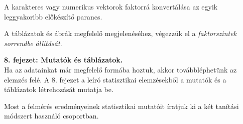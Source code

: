 \documentclass[
]{book}
\newenvironment{Shaded}{\begin{snugshade}}{\end{snugshade}}
\newcommand{\AttributeTok}[1]{\textcolor[rgb]{0.77,0.63,0.00}{#1}}
\newcommand{\CommentTok}[1]{\textcolor[rgb]{0.56,0.35,0.01}{\textit{#1}}}
\newcommand{\DecValTok}[1]{\textcolor[rgb]{0.00,0.00,0.81}{#1}}
\newcommand{\FunctionTok}[1]{\textcolor[rgb]{0.00,0.00,0.00}{#1}}
\newcommand{\NormalTok}[1]{#1}
\newcommand{\OtherTok}[1]{\textcolor[rgb]{0.56,0.35,0.01}{#1}}
\newcommand{\SpecialCharTok}[1]{\textcolor[rgb]{0.00,0.00,0.00}{#1}}
\newcommand{\StringTok}[1]{\textcolor[rgb]{0.31,0.60,0.02}{#1}}
\begin{document}
A karakteres vagy numerikus vektorok faktorrá konvertálása az egyik leggyakoribb előkészítő parancs.

\begin{Shaded}
\end{Shaded}

A táblázatok és ábrák megfelelő megjelenéséhez, végezzük el a \emph{faktorszintek sorrendbe állítását}.

\begin{Shaded}
\end{Shaded}

\textbf{8. fejezet: Mutatók és táblázatok.}\\
Ha az adatainkat már megfelelő formába hoztuk, akkor továbbléphetünk az elemzés felé. A 8. fejezet a leíró statisztikai elemzésekből a mutatók és a táblázatok létrehozását mutatja be.

Most a felmérés eredményeinek statisztikai mutatóit íratjuk ki a két tanítási módszert használó csoportban.

\begin{Shaded}
\end{Shaded}
\end{document}
